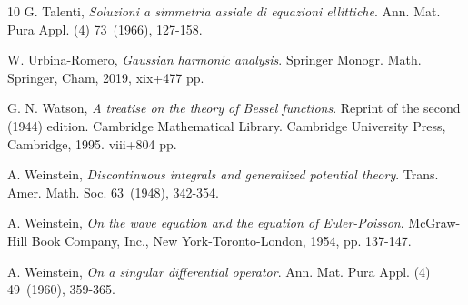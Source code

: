 \documentclass[11pt,a4paper]{amsart}
\numberwithin{equation}{section}
\numberwithin{equation}{section}
\begin{document}
\begin{thebibliography}{10}
G. Talenti, \emph{Soluzioni a simmetria assiale di equazioni ellittiche}. Ann. Mat. Pura Appl. (4) 73~(1966), 127-158.

W. Urbina-Romero, \emph{Gaussian harmonic analysis}.
Springer Monogr. Math.
Springer, Cham, 2019, xix+477 pp.

G. N. Watson, \emph{A treatise on the theory of Bessel functions}. Reprint of the second (1944) edition. Cambridge Mathematical Library. Cambridge University Press, Cambridge, 1995. viii+804 pp. 

A. Weinstein, \emph{Discontinuous integrals and generalized potential theory}. Trans. Amer. Math. Soc. 63~(1948), 342-354.

A. Weinstein, \emph{On the wave equation and the equation of Euler-Poisson}.
McGraw-Hill Book Company, Inc., New York-Toronto-London, 1954, pp. 137-147.

A. Weinstein, \emph{On a singular differential operator}.
Ann. Mat. Pura Appl. (4) 49~(1960), 359-365.




\end{thebibliography}
\end{document}
